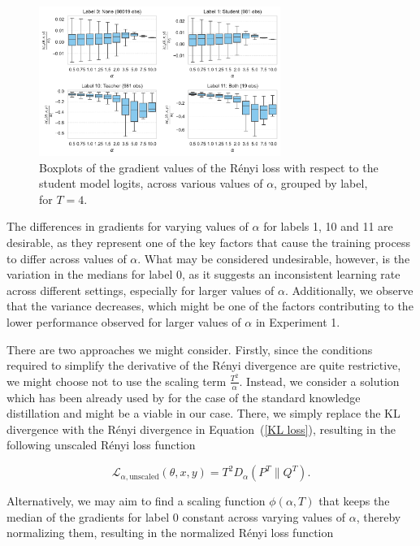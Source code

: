 \begin{figure}[h!]
	\centering
	\includegraphics[width=0.7\textwidth]{../img/gradients_boxplot_adjusted.pdf}
	\caption{Boxplots of the gradient values of the Rényi loss with respect to the student model logits, across various values of $\alpha$, grouped by label, for $T=4$.}
	\label{fig:gradients_boxplot_adjusted}
\end{figure}

The differences in gradients for varying values of $\alpha$ for labels 1, 10 and 11 are desirable, as they represent one of the key factors that cause the training process to differ across values of $\alpha$. What may be considered undesirable, however, is the variation in the medians for label 0, as it suggests an inconsistent learning rate across different settings, especially for larger values of $\alpha$. Additionally, we observe that the variance decreases, which might be one of the factors contributing to the lower performance observed for larger values of $\alpha$ in Experiment 1.

There are two approaches we might consider. Firstly, since the conditions required to simplify the derivative of the Rényi divergence are quite restrictive, we might choose not to use the scaling term $\frac{T^2}{\alpha}$. Instead, we consider a solution which has been already used by \cite{HintonVinyalsDean2015} for the case of the standard knowledge distillation and might be a viable in our case. There, we simply replace the KL divergence with the Rényi divergence in Equation~(\ref{KL loss}), resulting in the following unscaled Rényi loss function

\begin{equation}
	\mathcal{L}_{\alpha,\text{unscaled}}(\theta,x,y) = T^2 D_\alpha(P^T \| Q^T).
	\label{modified_RL_noadj}
\end{equation}

Alternatively, we may aim to find a scaling function $\phi(\alpha,T)$ that keeps the median of the gradients for label 0 constant across varying values of $\alpha$, thereby normalizing them, resulting in the normalized Rényi loss function

